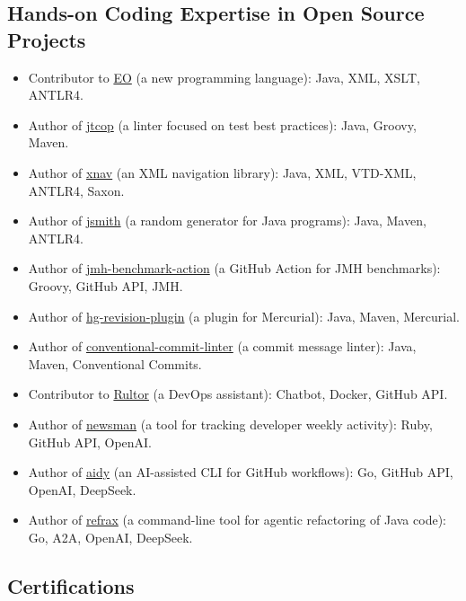 \documentclass{vl}
\begin{document}
    \subsection*{Hands-on Coding Expertise in Open Source Projects}
    \begin{itemize}
        \itemsep0em
        \item Contributor to \href{https://www.eolang.org}{EO} (a new programming language): Java, XML, XSLT, ANTLR4.
        \item Author of \href{https://github.com/volodya-lombrozo/jtcop}{jtcop} (a linter focused on test best practices): Java, Groovy, Maven.
        \item Author of \href{https://github.com/volodya-lombrozo/xnav}{xnav} (an XML navigation library): Java, XML, VTD-XML, ANTLR4, Saxon.
        \item Author of \href{https://github.com/volodya-lombrozo/jsmith}{jsmith} (a random generator for Java programs): Java, Maven, ANTLR4.
        \item Author of \href{https://github.com/volodya-lombrozo/jmh-benchmark-action}{jmh-benchmark-action} (a GitHub Action for JMH benchmarks): Groovy, GitHub API, JMH.
        \item Author of \href{https://github.com/volodya-lombrozo/hg-revision-plugin}{hg-revision-plugin} (a plugin for Mercurial): Java, Maven, Mercurial.
        \item Author of \href{https://github.com/volodya-lombrozo/conventional-commit-linter}{conventional-commit-linter} (a commit message linter): Java, Maven, Conventional Commits.
        \item Contributor to \href{https://www.rultor.com}{Rultor} (a DevOps assistant): Chatbot, Docker, GitHub API.
        \item Author of \href{https://github.com/volodya-lombrozo/newsman}{newsman} (a tool for tracking developer weekly activity): Ruby, GitHub API, OpenAI.
        \item Author of \href{https://github.com/volodya-lombrozo/aidy}{aidy} (an AI-assisted CLI for GitHub workflows): Go, GitHub API, OpenAI, DeepSeek.
        \item Author of \href{https://github.com/cqfn/refrax}{refrax} (a command-line tool for agentic refactoring of Java code): Go, A2A, OpenAI, DeepSeek.
    \end{itemize}

    \subsection*{Certifications}
\end{document}
